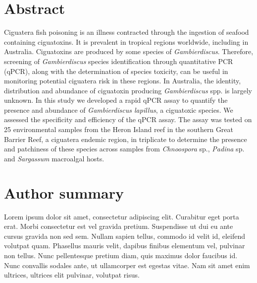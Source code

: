 \documentclass[10pt,letterpaper]{article}
\begin{document}
\section*{Abstract}
Ciguatera fish poisoning is an illness contracted through the ingestion of seafood containing ciguatoxins. 
It is prevalent in tropical regions worldwide, including in Australia. 
Ciguatoxins are produced by some species of \emph{Gambierdiscus}. 
Therefore, screening of \emph{Gambierdiscus} species identification through quantitative PCR (qPCR), along with the determination of species toxicity, can be useful in monitoring potential ciguatera risk in these regions. 
In Australia, the identity, distribution and abundance of ciguatoxin producing \textit{Gambierdiscus} spp. is largely unknown. 
In this study we developed a rapid qPCR assay to quantify the presence and abundance of \textit{Gambierdiscus lapillus}, a ciguatoxic species. 
We assessed the specificity and efficiency of the qPCR assay. 
The assay was tested on 25 environmental samples from the Heron Island reef in the southern Great Barrier Reef, a ciguatera endemic region, in triplicate to determine the presence and patchiness of these species across samples from \textit{Chnoospora} sp., \textit{Padina} sp. and \textit{Sargassum} macroalgal hosts. 

\section*{Author summary}
Lorem ipsum dolor sit amet, consectetur adipiscing elit. Curabitur eget porta erat. Morbi consectetur est vel gravida pretium. Suspendisse ut dui eu ante cursus gravida non sed sem. Nullam sapien tellus, commodo id velit id, eleifend volutpat quam. Phasellus mauris velit, dapibus finibus elementum vel, pulvinar non tellus. Nunc pellentesque pretium diam, quis maximus dolor faucibus id. Nunc convallis sodales ante, ut ullamcorper est egestas vitae. Nam sit amet enim ultrices, ultrices elit pulvinar, volutpat risus.

\linenumbers
\end{document}
